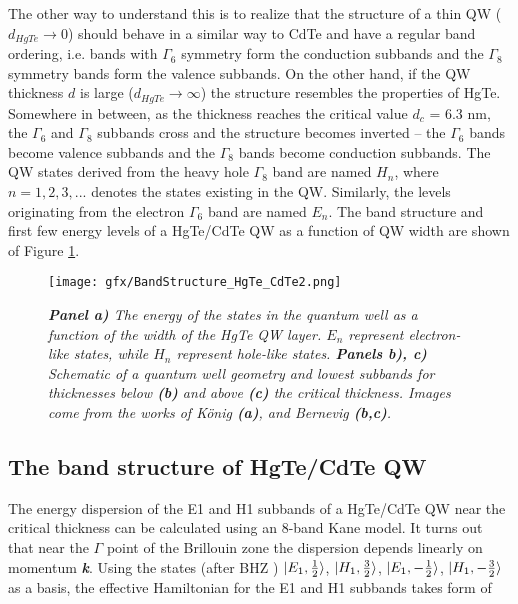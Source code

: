 \documentclass[titlepage,a4paper]{book}
\newcommand{\wciecie}{\quad\phantom{v}}
\begin{document}
The other way to understand this is to realize that the structure of a thin QW ($d_{HgTe} \rightarrow 0$) should behave in a similar way to CdTe and have a regular band ordering, i.e. bands with $\Gamma_6$ symmetry form the conduction subbands and the $\Gamma_8$ symmetry bands form the valence subbands. On the other hand, if the QW thickness $d$ is large ($d_{HgTe} \rightarrow \infty$) the structure resembles the properties of HgTe. Somewhere in between, as the thickness reaches the critical value $d_c$ = 6.3 nm, the $\Gamma_6$ and $\Gamma_8$ subbands cross and the structure becomes inverted -- the $\Gamma_6$ bands become valence subbands and the $\Gamma_8$ bands become conduction subbands. The QW states derived from the heavy hole $\Gamma_8$ band are named $H_n$, where $n = 1, 2, 3, ...$ denotes the states existing in the QW. Similarly, the levels originating from the electron $\Gamma_6$ band are named $E_n$. The band structure and first few energy levels of a HgTe/CdTe QW as a function of QW width are shown of Figure \ref{fig:BandStructure_HgTe_CdTe2}.  

\begin{figure}[ht]
	\centering
	\texttt{[image: gfx/BandStructure\_HgTe\_CdTe2.png]}
	\vspace{-10pt}
	\caption{\textit{\textbf{Panel a)} The energy of the states in the quantum well as a function of the width of the HgTe QW layer. $E_n$ represent electron-like states, while $H_n$ represent hole-like states. \textbf{Panels b), c)} Schematic of a quantum well geometry and lowest subbands for thicknesses below \textbf{(b)} and above \textbf{(c)} the critical thickness. Images come from the works of König \cite{Konig_MCT_SQW} \textbf{(a)}, and Bernevig \cite{Bernevig_Topology2} \textbf{(b,c)}.}}
	\label{fig:BandStructure_HgTe_CdTe2}
\end{figure} 


\subsection{The band structure of HgTe/CdTe QW}
\wciecie
The energy dispersion of the E1 and H1 subbands of a HgTe/CdTe QW near the critical thickness can be calculated using an 8-band Kane model. It turns out that near the $\Gamma$ point of the Brillouin zone the dispersion depends linearly on momentum \textbf{\textit{k}}. Using the states (after BHZ \cite{Bernevig_Topology2}) $\ket{E_1,\frac{1}{2}}$, $\ket{H_1,\frac{3}{2}}$, $\ket{E_1,-\frac{1}{2}}$, $\ket{H_1,-\frac{3}{2}}$ as a basis, the effective Hamiltonian for the E1 and H1 subbands takes form of
\end{document}
